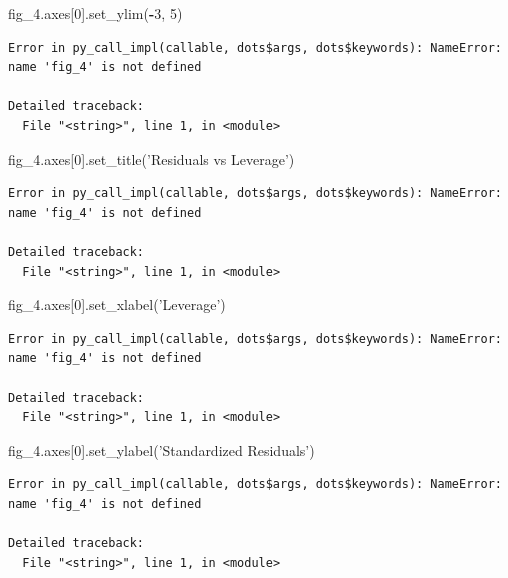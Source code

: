 \documentclass[]{book}
\newenvironment{Shaded}{\begin{snugshade}}{\end{snugshade}}
\newcommand{\DecValTok}[1]{\textcolor[rgb]{0.00,0.00,0.81}{#1}}
\newcommand{\NormalTok}[1]{#1}
\newcommand{\OperatorTok}[1]{\textcolor[rgb]{0.81,0.36,0.00}{\textbf{#1}}}
\newcommand{\StringTok}[1]{\textcolor[rgb]{0.31,0.60,0.02}{#1}}
\begin{document}
\begin{Shaded}
\begin{Highlighting}[]
\NormalTok{fig_4.axes[}\DecValTok{0}\NormalTok{].set_ylim(}\OperatorTok{-}\DecValTok{3}\NormalTok{, }\DecValTok{5}\NormalTok{)}
\end{Highlighting}
\end{Shaded}

\begin{verbatim}
Error in py_call_impl(callable, dots$args, dots$keywords): NameError: name 'fig_4' is not defined

Detailed traceback: 
  File "<string>", line 1, in <module>
\end{verbatim}

\begin{Shaded}
\begin{Highlighting}[]
\NormalTok{fig_4.axes[}\DecValTok{0}\NormalTok{].set_title(}\StringTok{'Residuals vs Leverage'}\NormalTok{)}
\end{Highlighting}
\end{Shaded}

\begin{verbatim}
Error in py_call_impl(callable, dots$args, dots$keywords): NameError: name 'fig_4' is not defined

Detailed traceback: 
  File "<string>", line 1, in <module>
\end{verbatim}

\begin{Shaded}
\begin{Highlighting}[]
\NormalTok{fig_4.axes[}\DecValTok{0}\NormalTok{].set_xlabel(}\StringTok{'Leverage'}\NormalTok{)}
\end{Highlighting}
\end{Shaded}

\begin{verbatim}
Error in py_call_impl(callable, dots$args, dots$keywords): NameError: name 'fig_4' is not defined

Detailed traceback: 
  File "<string>", line 1, in <module>
\end{verbatim}

\begin{Shaded}
\begin{Highlighting}[]
\NormalTok{fig_4.axes[}\DecValTok{0}\NormalTok{].set_ylabel(}\StringTok{'Standardized Residuals'}\NormalTok{)}
\end{Highlighting}
\end{Shaded}

\begin{verbatim}
Error in py_call_impl(callable, dots$args, dots$keywords): NameError: name 'fig_4' is not defined

Detailed traceback: 
  File "<string>", line 1, in <module>
\end{verbatim}
\end{document}
